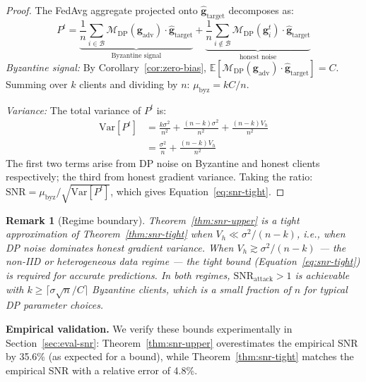 \documentclass[conference]{IEEEtran}
\newtheorem{remark}[theorem]{Remark}
\begin{document}
\begin{proof}
The FedAvg aggregate projected onto
$\hat{\mathbf{g}}_{\mathrm{target}}$ decomposes as:
\begin{equation*}
    P^t = \underbrace{
    \frac{1}{n}\sum_{i \in \mathcal{B}}
    \mathcal{M}_{\mathrm{DP}}(\mathbf{g}_{\mathrm{adv}})
    \cdot \hat{\mathbf{g}}_{\mathrm{target}}
    }_{\text{Byzantine signal}}
    +
    \underbrace{
    \frac{1}{n}\sum_{i \notin \mathcal{B}}
    \mathcal{M}_{\mathrm{DP}}(\mathbf{g}_i^t)
    \cdot \hat{\mathbf{g}}_{\mathrm{target}}
    }_{\text{honest noise}}
\end{equation*}
\textit{Byzantine signal:} By Corollary~\ref{cor:zero-bias},
$\mathbb{E}[\mathcal{M}_{\mathrm{DP}}
(\mathbf{g}_{\mathrm{adv}})
\cdot \hat{\mathbf{g}}_{\mathrm{target}}]
= C$. Summing over $k$ clients and dividing by $n$:
$\mu_{\mathrm{byz}} = kC/n$.

\textit{Variance:} The total variance of $P^t$ is:
\begin{align*}
    \mathrm{Var}[P^t]
    &= \frac{k \sigma^2}{n^2}
    + \frac{(n-k)\sigma^2}{n^2}
    + \frac{(n-k) V_h}{n^2} \\
    &= \frac{\sigma^2}{n}
    + \frac{(n-k) V_h}{n^2}
\end{align*}
The first two terms arise from DP noise on Byzantine
and honest clients respectively; the third from honest
gradient variance. Taking the ratio:
$\mathrm{SNR} = \mu_{\mathrm{byz}}
/ \sqrt{\mathrm{Var}[P^t]}$,
which gives Equation~\ref{eq:snr-tight}.
\end{proof}

\begin{remark}[Regime boundary]
Theorem~\ref{thm:snr-upper} is a tight approximation
of Theorem~\ref{thm:snr-tight} when $V_h \ll \sigma^2/(n-k)$,
i.e., when DP noise dominates honest gradient variance.
When $V_h \gtrsim \sigma^2/(n-k)$ --- the non-IID or
heterogeneous data regime --- the tight bound
(Equation~\ref{eq:snr-tight}) is required for accurate
predictions. In both regimes, $\mathrm{SNR}_{\mathrm{attack}}
> 1$ is achievable with $k \geq \lceil \sigma\sqrt{n}/C
\rceil$ Byzantine clients, which is a small fraction
of $n$ for typical DP parameter choices.
\end{remark}

\textbf{Empirical validation.} We verify these bounds
experimentally in Section~\ref{sec:eval-snr}:
Theorem~\ref{thm:snr-upper} overestimates the empirical
SNR by 35.6\% (as expected for a bound), while
Theorem~\ref{thm:snr-tight} matches the empirical SNR
with a relative error of 4.8\%.
\end{document}
